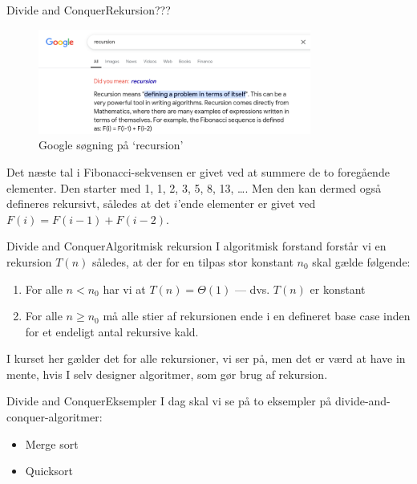 \documentclass{beamer}
\begin{document}
\begin{frame}{Divide and Conquer}{Rekursion???}
    \begin{figure}[h]
        \centering
        \includegraphics[width=0.8\textwidth]{recursion}
        \caption{Google søgning på `recursion'}
        \label{fig:recursion}
    \end{figure}

    \pause
    \begin{example}
        Det næste tal i Fibonacci-sekvensen er givet ved at summere de to
        foregående elementer. Den starter med 1, 1, 2, 3, 5, 8, 13, \ldots. Men
        den kan dermed også defineres rekursivt, således at det $i$'ende
        elementer er givet ved $F(i) = F(i-1) + F(i-2)$.
    \end{example}
\end{frame}

\begin{frame}{Divide and Conquer}{Algoritmisk rekursion}
    I algoritmisk forstand forstår vi en rekursion $T(n)$ således, at der for en
    tilpas stor konstant $n_0$ skal gælde følgende:

    \begin{enumerate}
        \item For alle $n < n_0$ har vi at $T(n) = \Theta(1)$ --- dvs. $T(n)$ er
            konstant
        \item For alle $n \geq n_0$ må alle stier af rekursionen ende i en
            defineret base case inden for et \alert{endeligt} antal rekursive
            kald.
    \end{enumerate}

    \pause
    I kurset her gælder det for alle rekursioner, vi ser på, men det er værd at
    have in mente, hvis I selv designer algoritmer, som gør brug af rekursion.
\end{frame}

\begin{frame}{Divide and Conquer}{Eksempler}
    I dag skal vi se på to eksempler på divide-and-conquer-algoritmer:

    \begin{itemize}
        \item Merge sort
        \item Quicksort
    \end{itemize}
\end{frame}
\end{document}

